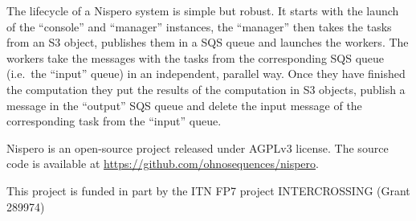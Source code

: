 The lifecycle of a Nispero system is simple but robust. It starts with
the launch of the ``console'' and ``manager'' instances, the ``manager''
then takes the tasks from an S3 object, publishes them in a SQS queue
and launches the workers. The workers take the messages with the tasks
from the corresponding SQS queue (i.e.~the ``input'' queue) in an
independent, parallel way. Once they have finished the computation they
put the results of the computation in S3 objects, publish a message in
the ``output'' SQS queue and delete the input message of the
corresponding task from the ``input'' queue.

Nispero is an open-source project released under AGPLv3 license. The
source code is available at \url{https://github.com/ohnosequences/nispero}.

This project is funded in part by the ITN FP7 project INTERCROSSING
(Grant 289974)
